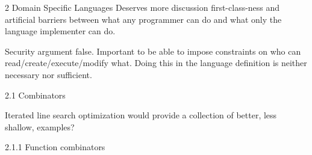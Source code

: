 \documentclass[11pt]{PalisadesLakesBook}
\begin{document}
\begin{plSection}{}
\begin{plSection}{2 Domain Specific Languages}
Deserves more discussion first-class-ness and artificial barriers
between what any programmer can do and what only
the language implementer can do.

Security argument false. 
Important to be able to impose constraints on
who can read/create/execute/modify what. 
Doing this in the language definition
is neither necessary nor sufficient.
\begin{plSection}{2.1 Combinators}

Iterated line search optimization would provide 
a collection of better, less shallow, 
examples?

\begin{plSection}{2.1.1 Function combinators}


\end{plSection}
\end{plSection}
\end{plSection}
\end{plSection}
\end{document}
